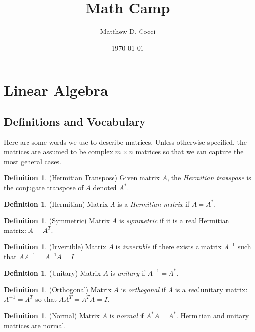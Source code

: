 \documentclass[12pt]{article}
\author{Matthew D. Cocci}
\title{Math Camp}
\date{\today}
\theoremstyle{plain}
\theoremstyle{definition}
\newtheorem{defn}[thm]{Definition}
\theoremstyle{remark}
\begin{document}
\maketitle

\tableofcontents


\clearpage
\section{Linear Algebra}

\subsection{Definitions and Vocabulary}

Here are some words we use to describe matrices. Unless otherwise
specified, the matrices are assumed to be complex $m\times n$ matrices
so that we can capture the most general cases.

\begin{defn}{(Hermitian Transpose)}
Given matrix $A$, the \emph{Hermitian transpose} is the conjugate
transpose of $A$ denoted $A^*$.
\end{defn}

\begin{defn}{(Hermitian)}
Matrix $A$ is a \emph{Hermitian matrix} if $A=A^*$.
\end{defn}

\begin{defn}{(Symmetric)}
Matrix $A$ is \emph{symmetric} if it is a real Hermitian matrix:
$A=A^T$.
\end{defn}

\begin{defn}{(Invertible)}
Matrix $A$ is \emph{invertible} if there exists a matrix $A^{-1}$ such
that $A A^{-1} = A^{-1}A=I$
\end{defn}

\begin{defn}{(Unitary)}
Matrix $A$ is \emph{unitary} if $A^{-1} = A^*$.
\end{defn}

\begin{defn}{(Orthogonal)}
Matrix $A$ is \emph{orthogonal} if $A$ is a \emph{real} unitary matrix:
$A^{-1} = A^T$ so that $AA^T = A^T A = I$.
\end{defn}

\begin{defn}{(Normal)}
Matrix $A$ is \emph{normal} if $A^* A = A^*$. Hermitian and unitary
matrices are normal.
\end{defn}
\end{document}
